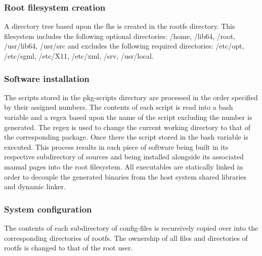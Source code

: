 
\subsubsection{Root filesystem creation}

A directory tree based upon the \gls{fhs} \cite{fhs} is created in the rootfs directory. This filesystem includes the following optional directories: /home, /lib64, /root, /usr/lib64, /usr/src and excludes the following required directories: /etc/opt, /etc/sgml, /etc/X11, /etc/xml, /srv, /usr/local.

\subsubsection{Software installation}

The scripts stored in the pkg-scripts directory are processed in the order specified by their assigned numbers. The contents of each script is read into a bash variable and a \gls{regex} based upon the name of the script excluding the number is generated. The \gls{regex} is used to change the current working directory to that of the corresponding package. Once there the script stored in the bash variable is executed. This process results in each piece of software being built in its respective subdirectory of sources and being installed alongside its associated manual pages into the root filesystem. All executables are statically linked in order to decouple the generated binaries from the host system shared libraries and dynamic linker.


\subsubsection{System configuration}

The contents of each subdirectory of config-files is recursively copied over into the corresponding directories of rootfs. The ownership of all files and directories of rootfs is changed to that of the root user.


